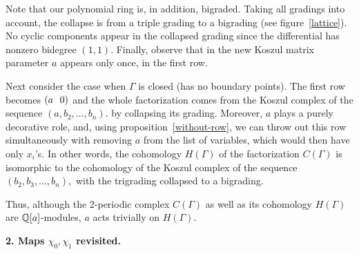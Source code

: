 \documentclass[12pt]{article}
\begin{document}
Note that our polynomial ring is, in addition, bigraded. 
Taking all gradings into account, the collapse is from a 
triple grading to a bigrading (see figure~\ref{lattice}). 
No cyclic components appear in the collapsed 
grading since the differential has nonzero bidegree $(1,1).$ 
Finally, observe that in the new Koszul matrix parameter $a$ appears only once, 
in the first row. 

\vspace{0.1in} 

Next consider the case when $\Gamma$ is closed (has no boundary points). 
The first row becomes $(a\hspace{0.1in} 0)$ and the whole factorization 
comes from the Koszul complex of the sequence $(a, b_2, \dots, b_n).$ 
by collapsing its grading. Moreover, $a$ plays a purely decorative 
role, and, using proposition~\ref{without-row}, we can throw out this row 
simultaneously with removing $a$ from the list of variables, which would then 
have only $x_i$'s. In other words, the cohomology $H(\Gamma)$ of the 
factorization $C(\Gamma)$ is isomorphic to the cohomology of 
the Koszul complex of the sequence  $(b_2, b_3, \dots , b_n),$ 
with the trigrading collapsed to a bigrading. 

Thus, although the 2-periodic complex $C(\Gamma)$ 
as well as its cohomology $H(\Gamma)$ are $\mathbb Q[a]$-modules, $a$ acts 
trivially on $H(\Gamma).$ 

\vspace{0.1in} 





{\bf 2. Maps $\chi_0, \chi_1$ revisited.} 

\vspace{0.1in} 
\end{document}
